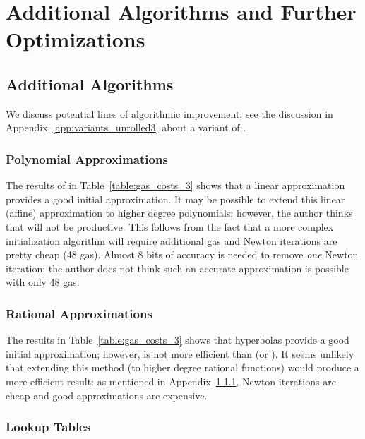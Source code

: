 \section{Additional Algorithms and Further Optimizations}
\label{app:optimization}

\subsection{Additional Algorithms}
\label{app:opt_additiona_algorithms}

We discuss potential lines of algorithmic improvement;
see the discussion in Appendix~\ref{app:variants_unrolled3}
about a variant of \UnrolledThree{}.

\subsubsection{Polynomial Approximations}
\label{app:opt_polynomial}

The results of \Linear{} in Table~\ref{table:gas_costs_3}
shows that a linear approximation provides
a good initial approximation.
It may be possible to extend this linear (affine) approximation
to higher degree polynomials;
however, the author thinks that will not be productive.
This follows from the fact that a more complex initialization
algorithm will require additional gas
and Newton iterations are pretty cheap (48 gas).
Almost 8 bits of accuracy is needed to remove \emph{one} Newton iteration;
the author does not think such an accurate approximation is
possible with only 48 gas.

\subsubsection{Rational Approximations}
\label{app:opt_rational}

The results \HyperFour{} in Table~\ref{table:gas_costs_3}
shows that hyperbolas provide a good initial approximation;
however, \HyperFour{} is not more efficient than \UnrolledThree{}
(or \Linear{}).
It seems unlikely that extending this method
(to higher degree rational functions)
would produce a more efficient result:
as mentioned in Appendix~\ref{app:opt_polynomial},
Newton iterations are cheap and good approximations are expensive.

\subsubsection{Lookup Tables}
\label{app:opt_lookup}

